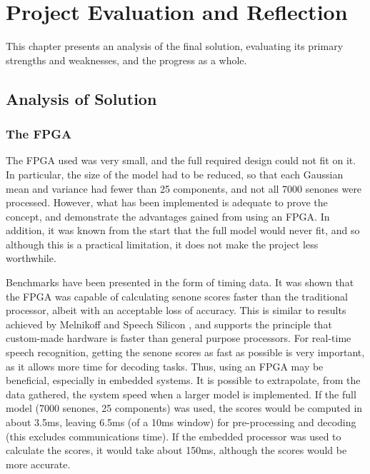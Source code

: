 \chapter{Project Evaluation and Reflection} %
\label{cha:project_analysis}

This chapter presents an analysis of the final solution, evaluating its primary strengths and weaknesses, and the progress as a whole.

\section{Analysis of Solution} %
\label{sec:analysis_of_solution}

	\subsection{The FPGA} %
	\label{sub:analysis_the_fpga}
		The FPGA used was very small, and the full required design could not fit on it.  In particular, the size of the model had to be reduced, so that each Gaussian mean and variance had fewer than 25 components, and not all 7000 senones were processed.  However, what has been implemented is adequate to prove the concept, and demonstrate the advantages gained from using an FPGA.  In addition, it was known from the start that the full model would never fit, and so although this is a practical limitation, it does not make the project less worthwhile.

		Benchmarks have been presented in the form of timing data.  It was shown that the FPGA was capable of calculating senone scores faster than the traditional processor, albeit with an acceptable loss of accuracy.  This is similar to results achieved by Melnikoff \cite{melnikoff2003speech} and Speech Silicon \cite{schuster2006speech}, and supports the principle that custom-made hardware is faster than general purpose processors.  For real-time speech recognition, getting the senone scores as fast as possible is very important, as it allows more time for decoding tasks.  Thus, using an FPGA may be beneficial, especially in embedded systems.  It is possible to extrapolate, from the data gathered, the system speed when a larger model is implemented.  If the full model (7000 senones, 25 components) was used, the scores would be computed in about 3.5ms, leaving 6.5ms (of a 10ms window) for pre-processing and decoding (this excludes communications time).  If the embedded processor was used to calculate the scores, it would take about 150ms, although the scores would be more accurate.

